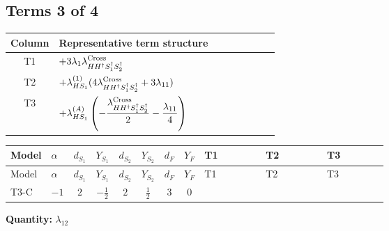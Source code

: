 \documentclass[8pt]{article}
\begin{document}
\begin{landscape}
\subsection*{Terms 3 of 4}
\begin{center}
\begin{tabular}{@{}c >{\raggedright\arraybackslash}p{0.82\linewidth}@{}}
\toprule
Column & Representative term structure \\
\midrule
T1 & \(\displaystyle +3 {\lambda_1} {\lambda_{H H^\dagger S_1^\dagger S_2^\dagger}^{\rm Cross}}\) \\
\midrule
T2 & \(\displaystyle +{\lambda_{HS_1}^{(1)}} (4 {\lambda_{H H^\dagger S_1^\dagger S_2^\dagger}^{\rm Cross}}+3 {\lambda_{11}})\) \\
\midrule
T3 & \(\displaystyle +{\lambda_{HS_1}^{(A)}} \left(-\frac{{\lambda_{H H^\dagger S_1^\dagger S_2^\dagger}^{\rm Cross}}}{2}-\frac{{\lambda_{11}}}{4}\right)\) \\
\midrule
\bottomrule
\end{tabular}
\end{center}
\smallskip
\tiny
\begin{longtable}{@{}llcccccc >{\raggedright\arraybackslash}p{0.21\linewidth} >{\raggedright\arraybackslash}p{0.21\linewidth} >{\raggedright\arraybackslash}p{0.21\linewidth}@{}}
\toprule
Model & $\alpha$ & $d_{S_1}$ & $Y_{S_1}$ & $d_{S_2}$ & $Y_{S_2}$ & $d_F$ & $Y_F$ & T1 & T2 & T3 \\
\midrule
\endfirsthead
\toprule
Model & $\alpha$ & $d_{S_1}$ & $Y_{S_1}$ & $d_{S_2}$ & $Y_{S_2}$ & $d_F$ & $Y_F$ & T1 & T2 & T3 \\
\midrule
\endhead
T3-C & $-1$ & $2$ & $-\frac{1}{2}$ & $2$ & $\frac{1}{2}$ & $3$ & $0$ & \scriptsize\adjustbox{max width=\linewidth}{$\begin{gathered} +3 {\lambda_1} {\lambda_{H H^\dagger S_1^\dagger S_2^\dagger}^{\rm Cross}}\end{gathered}$} & \scriptsize\adjustbox{max width=\linewidth}{$\begin{gathered} +{\lambda_{HS_1}^{(1)}} (4 {\lambda_{H H^\dagger S_1^\dagger S_2^\dagger}^{\rm Cross}}+3 {\lambda_{11}})\end{gathered}$} & \scriptsize\adjustbox{max width=\linewidth}{$\begin{gathered} +{\lambda_{HS_1}^{(A)}} \left(-\frac{{\lambda_{H H^\dagger S_1^\dagger S_2^\dagger}^{\rm Cross}}}{2}-\frac{{\lambda_{11}}}{4}\right)\end{gathered}$} \\
\midrule
\bottomrule
\end{longtable}
\clearpage
\noindent\textbf{Quantity: }$\lambda_{12}$\par\smallskip

\end{landscape}
\end{document}
